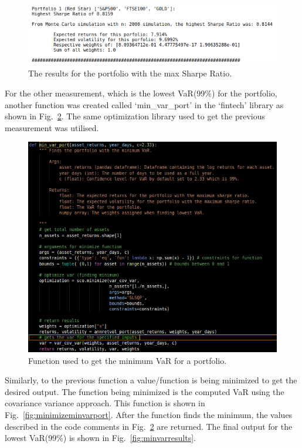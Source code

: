 \begin{figure}[H]
\centering
  \includegraphics[scale = .75]{imgs/maxsharperatioresults.png}
  \caption{The results for the portfolio with the max Sharpe Ratio.}
  \label{fig:maxsharperatioresults}
\end{figure}

\noindent
For the other measurement, which is the lowest VaR(99\%) for the portfolio, another function was created called ‘min\_var\_port’ in the ‘fintech’ library as shown in Fig.~\ref{fig:minvarport}. The same optimization library used to get the previous measurement was utilised.   

\begin{figure}[H]
\centering
  \includegraphics[scale = .75]{imgs/minvarport.png}
  \caption{Function used to get the minimum VaR for a portfolio.}
  \label{fig:minvarport}
\end{figure}

\noindent
Similarly, to the previous function a value/function is being minimized to get the desired output. The function being minimized is the computed VaR using the covariance variance approach. This function is shown in Fig.~\ref{fig:minimizeminvarport}. After the function finds the minimum, the values described in the code comments in Fig.~\ref{fig:minvarport} are returned. The final output for the lowest VaR(99\%) is shown in Fig.~\ref{fig:minvarresults}.


